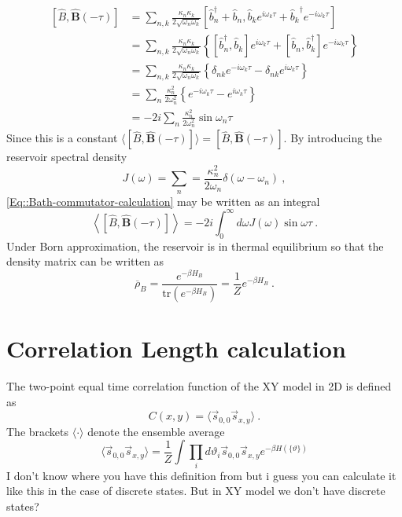	\begin{equation} \label{Eq::Bath-commutator-calculation}
		\begin{split}
			\left[\hat{B}, \boldsymbol{\hat{B}}(-\tau) \right] &=	\sum_{n,k}^{} \frac{\kappa_n \kappa_k}{2 \sqrt{\omega_n \omega_k}} \left[\hat{b}_n^\dagger + \hat{b}_n , {\hat{b}_k}e^{i \omega_k \tau} + {\hat{b}_k}^\dagger e^{-i \omega_k \tau} \right] \\
			&= \sum_{n,k}^{} \frac{\kappa_n \kappa_k}{2 \sqrt{\omega_n \omega_k}} \left\{\left[\hat{b}_n^\dagger, \hat{b}_k\right] e^{i\omega_k \tau} + \left[\hat{b}_n, \hat{b}_k^\dagger\right] e^{-i\omega_k \tau}\right\} \\
			&= \sum_{n,k}^{} \frac{\kappa_n \kappa_k}{2 \sqrt{\omega_n \omega_k}} \left\{\delta_{nk} e^{-i\omega_k \tau} - \delta_{nk} e^{i\omega_k \tau}\right\} \\
			&= \sum_{n}^{} \frac{\kappa_n^2 }{2 {\omega_n^2}} \left\{e^{-i\omega_k \tau} - e^{i\omega_k \tau}\right\} \\
			&= - 2 i  \sum_{n}^{} \frac{\kappa_n^2 }{2 {\omega_n^2}} \sin \omega_n \tau
		\end{split}
	\end{equation}
	Since this is a constant $\langle [\hat{B}, \boldsymbol{\hat{B}}(-\tau) ]  \rangle =	[\hat{B}, \boldsymbol{\hat{B}}(-\tau) ]$. By introducing the reservoir spectral density
	\begin{equation}
		J(\omega) =	\sum_n =	\frac{\kappa_n^2}{2 \omega_n} \delta(\omega - \omega_n)~,
	\end{equation}
	\autoref{Eq::Bath-commutator-calculation} may be written as an integral
	\begin{equation}
		\left\langle \left[\hat{B}, \boldsymbol{\hat{B}}(-\tau) \right] \right \rangle = -2i \int_{0}^{\infty} d\omega J(\omega) \sin \omega \tau~.
	\end{equation}
	Under Born approximation, the reservoir is in thermal equilibrium so that the density matrix can be written as
	\begin{equation}
		\overline{\rho}_B =	\frac{e^{-\beta H_B}}{\text{tr}\left(e^{-\beta H_B}\right)}=\frac{1}{Z} e^{-\beta H_B}~.
	\end{equation}
	\section{Correlation Length calculation} \label{Section::Corr-Lenght-Calculation}
	The two-point equal time correlation function of the XY model in 2D is defined as
	\begin{equation}
		C(x, y) = \langle \vec{s}_{0,0} \vec{s}_{x, y} \rangle ~.
	\end{equation}
	The brackets $\langle \cdot \rangle$ denote the ensemble average
	\begin{equation}
		\langle \vec{s}_{0,0} \vec{s}_{x, y} \rangle  = \frac{1}{Z} \int \prod_i d\vartheta_i \vec{s}_{0,0} \vec{s}_{x, y} e^{- \beta H(\{\vartheta\})}
	\end{equation}
	I don't know where you have this definition from but i guess you can calculate it like this in the case of discrete states. But in XY model we don't have discrete states?
	
